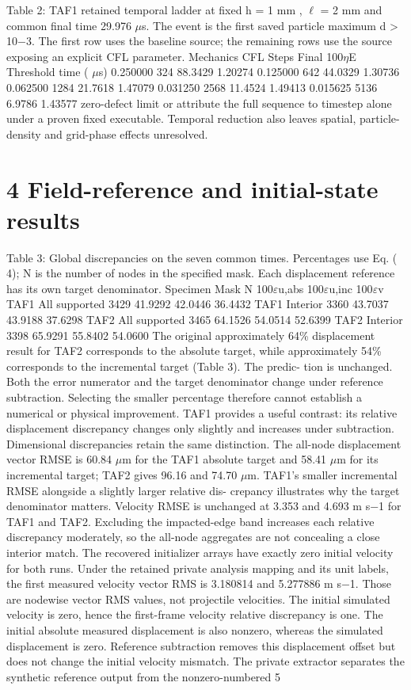 \documentclass[11pt]{article}
\begin{document}
Table 2: TAF1 retained temporal ladder at fixed h = 1 mm , \ensuremath{\ell} = 2 mm and common final time
29.976 \ensuremath{\mu}s. The event is the first saved particle maximum d > 10\ensuremath{-}3. The first row uses the baseline
source; the remaining rows use the source exposing an explicit CFL parameter.
Mechanics CFL Steps Final 100\ensuremath{\eta}E Threshold time ( \ensuremath{\mu}s)
0.250000 324 88.3429 1.20274
0.125000 642 44.0329 1.30736
0.062500 1284 21.7618 1.47079
0.031250 2568 11.4524 1.49413
0.015625 5136 6.9786 1.43577
zero-defect limit or attribute the full sequence to timestep alone under a proven fixed executable.
Temporal reduction also leaves spatial, particle-density and grid-phase effects unresolved.

\section*{4 Field-reference and initial-state results}

Table 3: Global discrepancies on the seven common times. Percentages use Eq. ( 4); N is the number
of nodes in the specified mask. Each displacement reference has its own target denominator.
Specimen Mask N 100\ensuremath{\varepsilon}u,abs 100\ensuremath{\varepsilon}u,inc 100\ensuremath{\varepsilon}v
TAF1 All supported 3429 41.9292 42.0446 36.4432
TAF1 Interior 3360 43.7037 43.9188 37.6298
TAF2 All supported 3465 64.1526 54.0514 52.6399
TAF2 Interior 3398 65.9291 55.8402 54.0600
The original approximately 64\% displacement result for TAF2 corresponds to the absolute
target, while approximately 54\% corresponds to the incremental target (Table 3). The predic-
tion is unchanged. Both the error numerator and the target denominator change under reference
subtraction. Selecting the smaller percentage therefore cannot establish a numerical or physical
improvement. TAF1 provides a useful contrast: its relative displacement discrepancy changes only
slightly and increases under subtraction.
Dimensional discrepancies retain the same distinction. The all-node displacement vector RMSE
is 60.84 \ensuremath{\mu}m for the TAF1 absolute target and 58.41 \ensuremath{\mu}m for its incremental target; TAF2 gives
96.16 and 74.70 \ensuremath{\mu}m. TAF1’s smaller incremental RMSE alongside a slightly larger relative dis-
crepancy illustrates why the target denominator matters. Velocity RMSE is unchanged at 3.353
and 4.693 m s\ensuremath{-}1 for TAF1 and TAF2. Excluding the impacted-edge band increases each relative
discrepancy moderately, so the all-node aggregates are not concealing a close interior match.
The recovered initializer arrays have exactly zero initial velocity for both runs. Under the
retained private analysis mapping and its unit labels, the first measured velocity vector RMS is
3.180814 and 5.277886 m s\ensuremath{-}1. Those are nodewise vector RMS values, not projectile velocities. The
initial simulated velocity is zero, hence the first-frame velocity relative discrepancy is one. The
initial absolute measured displacement is also nonzero, whereas the simulated displacement is zero.
Reference subtraction removes this displacement offset but does not change the initial velocity
mismatch.
The private extractor separates the synthetic reference output from the nonzero-numbered
5
\end{document}
